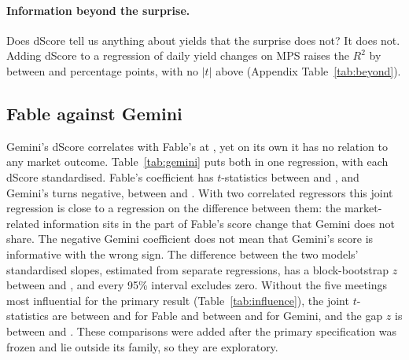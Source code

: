 \begin{table}[t]
\centering
\caption{Exploratory checks}\label{tab:extra}
\footnotesize

\end{table}

\paragraph{Information beyond the surprise.} Does dScore tell us anything about yields that the surprise
does not? It does not. Adding dScore to
a regression of daily yield changes on MPS raises the $R^2$ by between  and
 percentage points, with no $|t|$ above  (Appendix
Table~\ref{tab:beyond}).

\subsection{Fable against Gemini}

Gemini's dScore correlates with Fable's at , yet on its own it has no relation to any
market outcome. Table~\ref{tab:gemini} puts both in one regression, with each dScore standardised. Fable's
coefficient has $t$-statistics between  and , and Gemini's turns negative, between
 and . With two correlated regressors this joint regression is close to a
regression on the difference between them: the market-related information sits in the part of Fable's
score change that Gemini does not share. The negative Gemini coefficient does not mean that Gemini's score
is informative with the wrong sign. The difference between the two models' standardised slopes, estimated
from separate regressions, has a block-bootstrap $z$ between  and 
\citep[moving blocks of four meetings, 2{,}000 draws;][]{kunsch1989}, and every 95\% interval excludes
zero. Without the five meetings most influential for the primary result (Table~\ref{tab:influence}), the
joint $t$-statistics are between  and  for Fable and between 
and  for Gemini, and the gap $z$ is between  and . These
comparisons were added after the primary specification was frozen and lie outside its family, so they
are exploratory.

